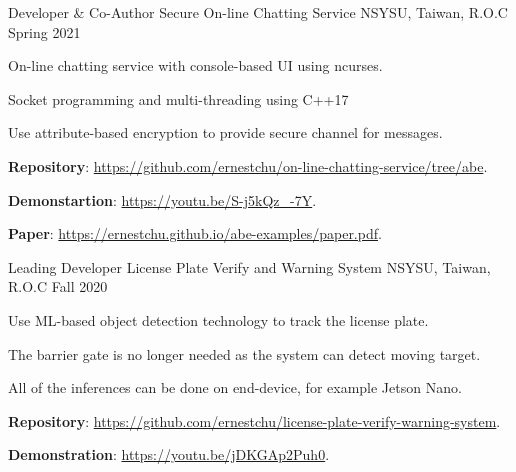 \begin{cventries}
  \cventry
    {Developer \& Co-Author} %
    {Secure On-line Chatting Service} %
    {NSYSU, Taiwan, R.O.C} %
    {Spring 2021} %
    {
      \begin{cvitems} %
        \item {On-line chatting service with console-based UI using ncurses.}
        \item {Socket programming and multi-threading using C++17}
        \item {Use attribute-based encryption to provide secure channel for messages.}
        \item {\textbf{Repository}: \href{https://github.com/ernestchu/on-line-chatting-service/tree/abe}{https://github.com/ernestchu/on-line-chatting-service/tree/abe}.}
        \item {\textbf{Demonstartion}: \href{https://youtu.be/S-j5kQz\_-7Y}{https://youtu.be/S-j5kQz\_-7Y}.}
        \item {\textbf{Paper}: \href{https://ernestchu.github.io/abe-examples/paper.pdf}{https://ernestchu.github.io/abe-examples/paper.pdf}.}
      \end{cvitems}
    }

  \cventry
    {Leading Developer} %
    {License Plate Verify and Warning System} %
    {NSYSU, Taiwan, R.O.C} %
    {Fall 2020} %
    {
      \begin{cvitems} %
        \item {Use ML-based object detection technology to track the license plate.}
        \item {The barrier gate is no longer needed as the system can detect moving target.}
        \item {All of the inferences can be done on end-device, for example Jetson Nano.}
        \item {\textbf{Repository}: \href{https://github.com/ernestchu/license-plate-verify-warning-system}{https://github.com/ernestchu/license-plate-verify-warning-system}.}
        \item {\textbf{Demonstration}: \href{https://youtu.be/jDKGAp2Puh0}{https://youtu.be/jDKGAp2Puh0}.}
      \end{cvitems}
    }


\end{cventries}
